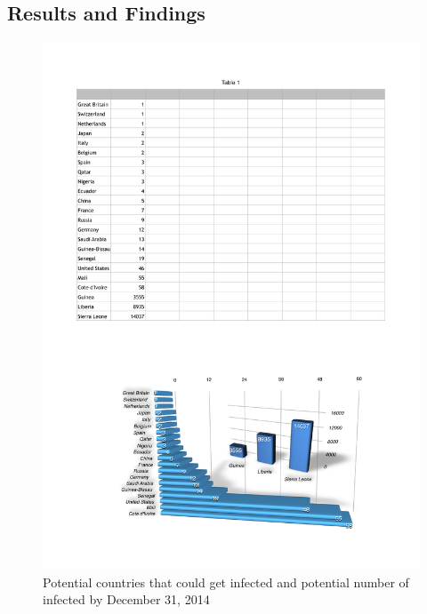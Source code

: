 \documentclass[10pt, journal,onecolumn]{IEEEtran}
\begin{document}
\subsection{Results and Findings}
\label{SubSec:WorldResult}

\begin{figure}[ht]
\centering
\includegraphics[scale=.6]{countriesInfected.pdf}
\caption{Potential countries that could get infected and potential number of infected by December 31, 2014}
\label{Fig:world_infected}
\end{figure}
\end{document}
